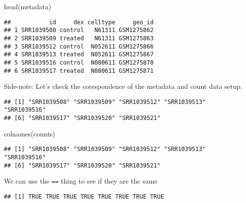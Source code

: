 \documentclass[
]{article}
\newenvironment{Shaded}{\begin{snugshade}}{\end{snugshade}}
\newcommand{\FunctionTok}[1]{\textcolor[rgb]{0.00,0.00,0.00}{#1}}
\newcommand{\NormalTok}[1]{#1}
\newcommand{\SpecialCharTok}[1]{\textcolor[rgb]{0.00,0.00,0.00}{#1}}
\begin{document}
\begin{Shaded}
\begin{Highlighting}[]
\FunctionTok{head}\NormalTok{(metadata)}
\end{Highlighting}
\end{Shaded}

\begin{verbatim}
##           id     dex celltype     geo_id
## 1 SRR1039508 control   N61311 GSM1275862
## 2 SRR1039509 treated   N61311 GSM1275863
## 3 SRR1039512 control  N052611 GSM1275866
## 4 SRR1039513 treated  N052611 GSM1275867
## 5 SRR1039516 control  N080611 GSM1275870
## 6 SRR1039517 treated  N080611 GSM1275871
\end{verbatim}

Side-note: Let's check the corespondence of the metadata and count data
setup.

\begin{Shaded}
\end{Shaded}

\begin{verbatim}
## [1] "SRR1039508" "SRR1039509" "SRR1039512" "SRR1039513" "SRR1039516"
## [6] "SRR1039517" "SRR1039520" "SRR1039521"
\end{verbatim}

\begin{Shaded}
\begin{Highlighting}[]
\FunctionTok{colnames}\NormalTok{(counts)}
\end{Highlighting}
\end{Shaded}

\begin{verbatim}
## [1] "SRR1039508" "SRR1039509" "SRR1039512" "SRR1039513" "SRR1039516"
## [6] "SRR1039517" "SRR1039520" "SRR1039521"
\end{verbatim}

We can use the \texttt{==} thing to see if they are the same

\begin{Shaded}
\end{Shaded}

\begin{verbatim}
## [1] TRUE TRUE TRUE TRUE TRUE TRUE TRUE TRUE
\end{verbatim}
\end{document}

